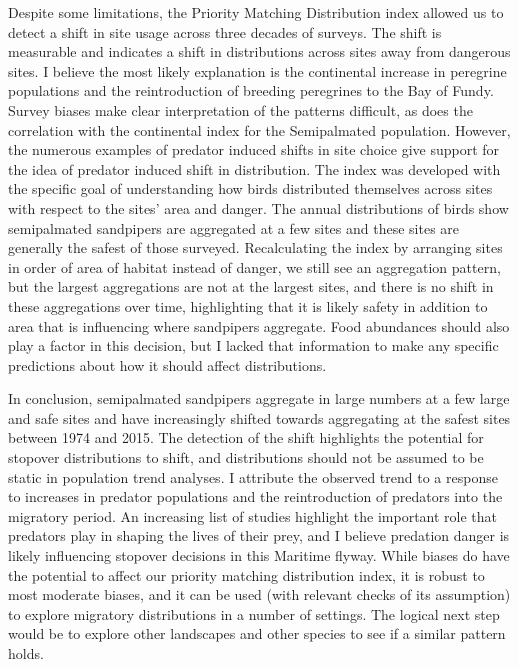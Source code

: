 Despite some limitations, the Priority Matching Distribution index allowed us to detect a shift in site usage across three decades of surveys. The shift is measurable and indicates a shift in distributions across sites away from dangerous sites. I believe the most likely explanation is the continental increase in peregrine populations and the reintroduction of breeding peregrines to the Bay of Fundy. Survey biases make clear interpretation of the patterns difficult, as does the correlation with the continental index for the Semipalmated population. However, the numerous examples of predator induced shifts in site choice give support for the idea of predator induced shift in distribution. The index was developed with the specific goal of understanding how birds distributed themselves across sites with respect to the sites' area and danger. The annual distributions of birds show semipalmated sandpipers are aggregated at a few sites and these sites are generally the safest of those surveyed. Recalculating the index by arranging sites in order of area of habitat instead of danger, we still see an aggregation pattern, but the largest aggregations are not at the largest sites, and there is no shift in these aggregations over time, highlighting that it is likely safety in addition to area that is influencing where sandpipers aggregate. Food abundances should also play a factor in this decision, but I lacked that information to make any specific predictions about how it should affect distributions.

In conclusion, semipalmated sandpipers aggregate in large numbers at a few large and safe sites and have increasingly shifted towards aggregating at the safest sites between 1974 and 2015. The detection of the shift highlights the potential for stopover distributions to shift, and distributions should not be assumed to be static in population trend analyses. I attribute the observed trend to a response to increases in predator populations and the reintroduction of predators into the migratory period. An increasing list of studies highlight the important role that predators play in shaping the lives of their prey, and I believe predation danger is likely influencing stopover decisions in this Maritime flyway. While biases do have the potential to affect our priority matching distribution index, it is robust to most moderate biases, and it can be used (with relevant checks of its assumption) to explore migratory distributions in a number of settings. The logical next step would be to explore other landscapes and other species to see if a similar pattern holds.